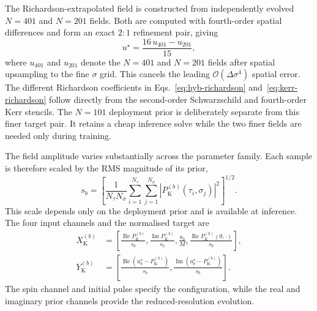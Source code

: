The Richardson-extrapolated field is constructed from independently
evolved $N=401$ and $N=201$ fields. Both are computed with
fourth-order spatial differences and form an exact $2{:}1$ refinement
pair, giving
\begin{equation}
  u^{\star} = \frac{16\, u_{401} - u_{201}}{15},
  \label{eq:kerr-richardson}
\end{equation}
where $u_{401}$ and $u_{201}$ denote the $N = 401$ and $N = 201$
fields after spatial upsampling to the fine $\sigma$ grid. This
cancels the leading $\mathcal O(\Delta\sigma^4)$ spatial error. The
different Richardson coefficients in Eqs.~\eqref{eq:hyb-richardson}
and~\eqref{eq:kerr-richardson} follow directly from the second-order
Schwarzschild and fourth-order Kerr stencils. The $N=101$ deployment
prior is deliberately separate from this finer target pair. It
retains a cheap inference solve while the two finer fields are
needed only during training.

The field amplitude varies substantially across the parameter family.
Each sample is therefore scaled by the RMS magnitude of its prior,
\begin{equation}
  s_b
  =\left[
      \frac{1}{N_\tau N_\sigma}
      \sum_{i=1}^{N_\tau}\sum_{j=1}^{N_\sigma}
      |P_{\mathrm K}^{(b)}(\tau_i,\sigma_j)|^2
    \right]^{1/2}.
  \label{eq:kerr-scale}
\end{equation}
This scale depends only on the deployment prior and is available at
inference. The four input channels and the normalised target are
\begin{align}
  X_{\mathrm K}^{(b)}
  &=\left[
      \frac{\operatorname{Re}P_{\mathrm K}^{(b)}}{s_b},
      \frac{\operatorname{Im}P_{\mathrm K}^{(b)}}{s_b},
      \frac{a_b}{M},
      \frac{\operatorname{Re}P_{\mathrm K}^{(b)}(0,\cdot)}{s_b}
    \right],
  \nonumber\\
  Y_{\mathrm K}^{(b)}
  &=\left[
      \frac{\operatorname{Re}(u_b^\star-P_{\mathrm K}^{(b)})}{s_b},
      \frac{\operatorname{Im}(u_b^\star-P_{\mathrm K}^{(b)})}{s_b}
    \right].
  \label{eq:kerr-input-target}
\end{align}
The spin channel and initial pulse specify the configuration, while
the real and imaginary prior channels provide the reduced-resolution
evolution.


